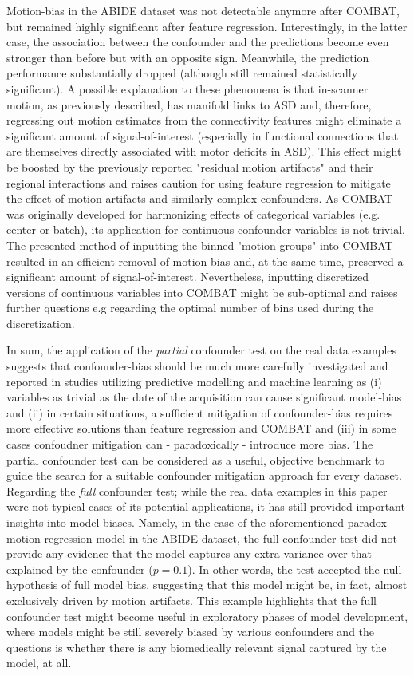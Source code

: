 \documentclass{article}
\begin{document}
Motion-bias in the ABIDE dataset was not detectable anymore after COMBAT, but remained highly significant after feature regression.
Interestingly, in the latter case, the association between the confounder and the predictions become even stronger than before but with an opposite sign. Meanwhile, the prediction performance substantially dropped (although still remained statistically significant). 
A possible explanation to these phenomena is that in-scanner motion, as previously described\citep{fournier2010motor, anzulewicz2016toward}, has manifold links to ASD and, therefore, regressing out motion estimates from the connectivity features might eliminate a significant amount of signal-of-interest (especially in functional connections that are themselves directly associated with motor deficits in ASD).
This effect might be boosted by the previously reported "residual motion artifacts" and their regional interactions\citep{spisak2014voxel} and raises caution for using feature regression to mitigate the effect of motion artifacts and similarly complex confounders.
 As COMBAT was originally developed for harmonizing effects of categorical variables (e.g. center or batch), its application for continuous confounder variables is not trivial. The presented method of inputting the binned "motion groups" into COMBAT resulted in an efficient removal of motion-bias and, at the same time, preserved a significant amount of signal-of-interest. 
 Nevertheless, inputting discretized versions of continuous variables into COMBAT might be sub-optimal and raises further questions e.g regarding the optimal number of bins used during the discretization.
 
 In sum, the application of the \emph{partial} confounder test on the real data examples suggests that confounder-bias should be much more carefully investigated and reported in studies utilizing predictive modelling and machine learning as (i) variables as trivial as the date of the acquisition can cause significant model-bias and (ii) in certain situations, a sufficient mitigation of confounder-bias requires more effective solutions than feature regression and COMBAT and (iii) in some cases confoudner mitigation can - paradoxically - introduce more bias. The partial confounder test can be considered as a useful, objective benchmark to guide the search for a suitable confounder mitigation approach for every dataset.
 Regarding the \emph{full} confounder test; while the real data examples in this paper were not typical cases of its potential applications, it has still provided important insights into model biases. Namely, in the case of the aforementioned paradox motion-regression model in the ABIDE dataset, the full confounder test did not provide any evidence that the model captures any extra variance over that explained by the confounder ($p=0.1$). In other words, the test accepted the null hypothesis of full model bias, suggesting that this model might be, in fact, almost exclusively driven by motion artifacts.
This example highlights that the full confounder test might become useful in exploratory phases of model development, where models might be still severely biased by various confounders and the questions is whether there is any biomedically relevant signal captured by the model, at all.
\end{document}
